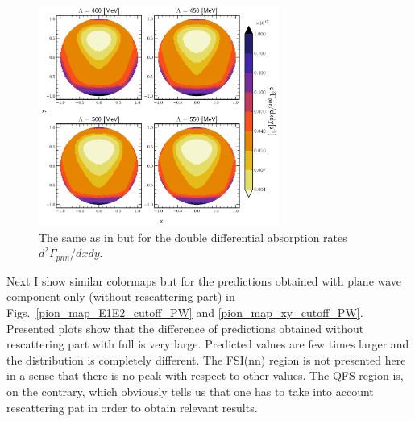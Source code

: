     \begin{figure}[h]
        \begin{center}
        \includegraphics[width=0.7\textwidth]{PlotData/PION/Dalitz_maps/figures/Dalitz_map_pnn_xy_cutofs.pdf}
        \end{center}
        \caption{The same as in  but for the double differential absorption rates
        $d^2 \Gamma_{pnn}/dxdy$.}
        \label{pion_map_xy_cutoff}
    \end{figure}

    Next I show similar colormaps but for the predictions obtained with plane wave component only (without rescattering part)
    in Figs.~\ref{pion_map_E1E2_cutoff_PW} and \ref{pion_map_xy_cutoff_PW}. Presented plots show that
    the difference of predictions obtained without rescattering part with full is very large. 
    Predicted values 
    are few times larger and the distribution is completely different.
    The FSI(nn) region is not presented here in a sense that there is no peak with respect to other 
    values. The QFS region is, on the contrary, 
    which obviously tells us that one has to take into account rescattering pat in order to obtain relevant results.   

